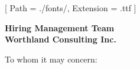 


\renewcommand{\photo}[2]{}

\geometry{
  left=2cm,
  right=2cm,
  top=2cm,
  bottom=2cm
}



\makecvheader

\setmainfont{NotoSans-Regular}[
  Path = ./fonts/,
  Extension = .ttf
]

\vspace{1cm}
\indent\textbf{Hiring Management Team}\\
\indent\textbf{Worthland Consulting Inc.}

\vspace{0.5cm}

\noindent To whom it may concern:

\vspace{0.5cm}

